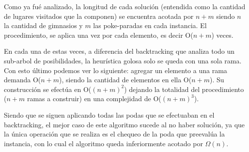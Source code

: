 Como ya fué analizado, la longitud de cada solución (entendida como la cantidad de lugares visitados que la componen) se encuentra acotada por $n + m$ siendo $n$ la cantidad de gimnasios y $m$ las poke-paradas en cada instancia. El procedimiento, se aplica una vez por cada elemento, es decir O($n+m$) veces.

En cada una de estas veces, a diferencia del backtracking que analiza todo un sub-arbol de posibilidades, la heur\'istica golosa solo se queda con una sola rama. Con esto último podemos ver lo siguiente: agregar un elemento a una rama demanda O($n+m$), siendo la cantidad de elementos en ella O($n+m$). Su construcción se efectúa en O($(n+m)^2$) dejando la totalidad del procedimiento ($n+m$ ramas a construir) en una complejidad de O($(n+m)^3$).

Siendo que se siguen aplicando todas las podas que se efectuaban en el backtracking, el mejor caso de este algoritmo sucede al no haber solución, ya que la única operación que se realiza es el chequeo de la poda que preevalúa la instancia, con lo cual el algoritmo queda inferiormente acotado por $\Omega(n)$.